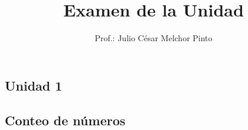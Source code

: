 \documentclass[12pt,addpoints]{evalua}
\title{Examen de la Unidad}
\author{Prof.: Julio César Melchor Pinto}
\begin{document}
\tableofcontents
\vfill
\afterpage{\blankpage}
\begin{questions}\large
	\section*{Unidad 1}

	\subsection*{Conteo de números}



\end{questions}
\end{document}
